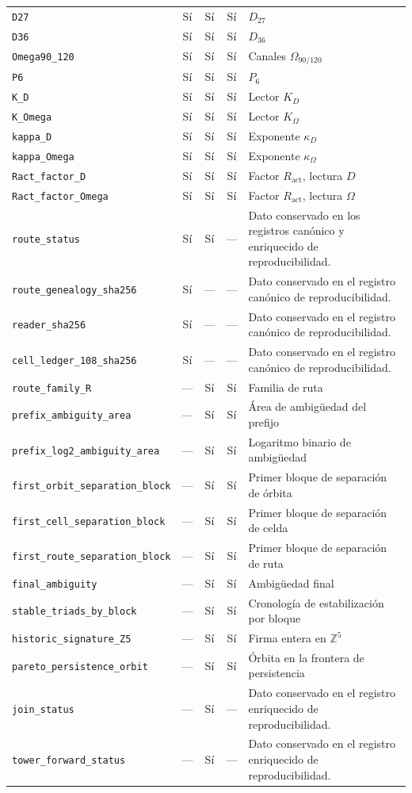 \begin{longtable}{p{}ccc p{}}
\nolinkurl{D27} & Sí & Sí & Sí & \(D_{27}\) \\
\nolinkurl{D36} & Sí & Sí & Sí & \(D_{36}\) \\
\nolinkurl{Omega90_120} & Sí & Sí & Sí & Canales \(\Omega_{90/120}\) \\
\nolinkurl{P6} & Sí & Sí & Sí & \(P_6\) \\
\nolinkurl{K_D} & Sí & Sí & Sí & Lector \(K_D\) \\
\nolinkurl{K_Omega} & Sí & Sí & Sí & Lector \(K_\Omega\) \\
\nolinkurl{kappa_D} & Sí & Sí & Sí & Exponente \(\kappa_D\) \\
\nolinkurl{kappa_Omega} & Sí & Sí & Sí & Exponente \(\kappa_\Omega\) \\
\nolinkurl{Ract_factor_D} & Sí & Sí & Sí & Factor \(R_{\mathrm{act}}\), lectura \(D\) \\
\nolinkurl{Ract_factor_Omega} & Sí & Sí & Sí & Factor \(R_{\mathrm{act}}\), lectura \(\Omega\) \\
\nolinkurl{route_status} & Sí & Sí & --- & Dato conservado en los registros canónico y enriquecido de reproducibilidad. \\
\nolinkurl{route_genealogy_sha256} & Sí & --- & --- & Dato conservado en el registro canónico de reproducibilidad. \\
\nolinkurl{reader_sha256} & Sí & --- & --- & Dato conservado en el registro canónico de reproducibilidad. \\
\nolinkurl{cell_ledger_108_sha256} & Sí & --- & --- & Dato conservado en el registro canónico de reproducibilidad. \\
\nolinkurl{route_family_R} & --- & Sí & Sí & Familia de ruta \\
\nolinkurl{prefix_ambiguity_area} & --- & Sí & Sí & Área de ambigüedad del prefijo \\
\nolinkurl{prefix_log2_ambiguity_area} & --- & Sí & Sí & Logaritmo binario de ambigüedad \\
\nolinkurl{first_orbit_separation_block} & --- & Sí & Sí & Primer bloque de separación de órbita \\
\nolinkurl{first_cell_separation_block} & --- & Sí & Sí & Primer bloque de separación de celda \\
\nolinkurl{first_route_separation_block} & --- & Sí & Sí & Primer bloque de separación de ruta \\
\nolinkurl{final_ambiguity} & --- & Sí & Sí & Ambigüedad final \\
\nolinkurl{stable_triads_by_block} & --- & Sí & Sí & Cronología de estabilización por bloque \\
\nolinkurl{historic_signature_Z5} & --- & Sí & Sí & Firma entera en \(\mathbb Z^5\) \\
\nolinkurl{pareto_persistence_orbit} & --- & Sí & Sí & Órbita en la frontera de persistencia \\
\nolinkurl{join_status} & --- & Sí & --- & Dato conservado en el registro enriquecido de reproducibilidad. \\
\nolinkurl{tower_forward_status} & --- & Sí & --- & Dato conservado en el registro enriquecido de reproducibilidad. \\
\hline
\end{longtable}

